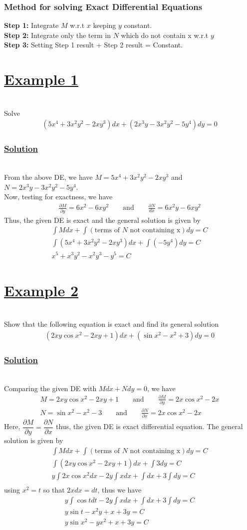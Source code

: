 \documentclass[11pt]{report}
\newcommand{\ubt}[1]{\textbf{\underline{#1}}}
\newcommand{\sps}{\\[0.2cm]}
\newcommand{\spn}[1]{\\[#1cm]}
\newcommand{\bt}[1]{\textbf{#1}}
\newcommand{\example}[1]{\section*{\ubt{Example #1}}{~}\spn{-1}}
\newcommand{\solution}{\subsubsection{\ubt{Solution}}{~}\spn{-1}}
\begin{document}
	\subsubsection*{Method for solving Exact Differential Equations}
	\bt{Step 1:} Integrate $M$ w.r.t $x$ keeping $y$ constant.\\
	\bt{Step 2:} Integrate only the term in $N$ which do not contain x w.r.t $y$ \\
	\bt{Step 3:} Setting Step 1 result + Step 2 result = Constant.\\
	
	\example{1}
	Solve
	\begin{eqnarray*}
		(5x^4 + 3x^2y^2 - 2xy^3)dx + (2x^3y-3x^2y^2 - 5y^4)dy = 0
	\end{eqnarray*}

	\solution
	From the above DE, we have $M=5x^4 + 3x^2y^2 - 2xy^3$ and $N=2x^3y - 3x^2y^2 - 5y^4$.\sps
	Now, testing for exactness, we have
	\begin{eqnarray*}
		\frac{\partial M}{\partial y} = 6x^2 - 6xy^2 \qquad\text{and}\qquad \frac{\partial N}{dx} = 6x^2y-6xy^2
	\end{eqnarray*}
	Thus, the given DE is exact and the general solution is given by
	\begin{eqnarray*}
		\int Mdx + \int (\text{terms of $N$ not containing x})dy = C\sps
		\int(5x^4+3x^2y^2 - 2xy^3)dx + \int(-5y^4)dy = C\sps
		x^5 + x^3y^2 - x^2y^3 - y^5 = C
	\end{eqnarray*}
	
	\example{2}
	Show that the following equation is exact and find its general solution
	\begin{eqnarray*}
		\left(2xy\cos x^2 - 2xy + 1\right)dx + \left(\sin x^2 - x^2 + 3\right)dy = 0
	\end{eqnarray*}

	\solution
	Comparing the given DE with $Mdx + Ndy = 0$, we have
	\begin{eqnarray*}
		M = 2xy\cos x^2 - 2xy + 1 \qquad\text{and}\qquad \frac{\partial M}{\partial y} = 2x\cos x^2 - 2x\sps
		N = \sin x^2 - x^2 -3 \qquad\text{and}\qquad \frac{\partial N}{\partial x} = 2x\cos x^2 - 2x
	\end{eqnarray*}
	Here, $\dfrac{\partial M}{\partial y} = \dfrac{\partial N}{\partial x}$ thus, the given DE is exact differential equation. The general solution is given by
	\begin{eqnarray*}
		\int Mdx + \int (\text{terms of $N$ not containing x})dy = C\sps
		\int (2xy\cos x^2 - 2xy + 1) dx + \int 3dy = C\sps
		y\int 2x \cos x^2 dx - 2y\int x dx + \int dx+ 3\int dy = C\sps 
	\end{eqnarray*}
	using $x^2 = t$ so that $2xdx = dt$, thus we have
	\begin{eqnarray*}
		y\int \cos t dt - 2y\int x dx + \int dx+ 3\int dy = C\sps
		y\sin t - x^2 y + x + 3y = C\sps
		y\sin x^2 - yx^2 + x + 3y = C
	\end{eqnarray*}
	
\end{document}
